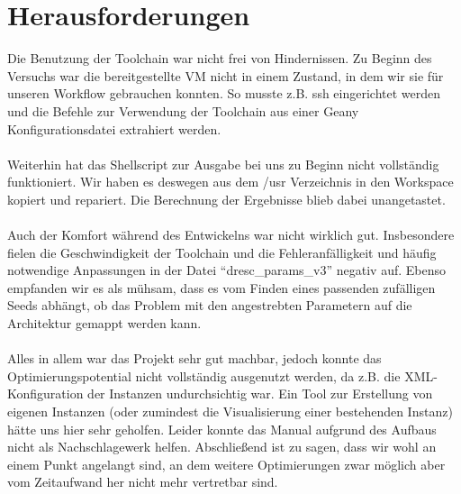 \documentclass[oneside,11pt,accentcolor=tud2b, nochapname]{tudexercise}
\begin{document}
\section*{Herausforderungen}

Die Benutzung der Toolchain war nicht frei von Hindernissen.
Zu Beginn des Versuchs war die bereitgestellte VM nicht in einem Zustand, in dem wir sie für unseren Workflow gebrauchen konnten.
So musste z.B. ssh eingerichtet werden und die Befehle zur Verwendung der Toolchain aus einer Geany Konfigurationsdatei extrahiert werden.\\
\\
Weiterhin hat das Shellscript zur Ausgabe bei uns zu Beginn nicht vollständig funktioniert. 
Wir haben es deswegen aus dem /usr Verzeichnis in den Workspace kopiert und repariert.
Die Berechnung der Ergebnisse blieb dabei unangetastet.\\
\\
Auch der Komfort während des Entwickelns war nicht wirklich gut.
Insbesondere fielen die Geschwindigkeit der Toolchain und die Fehleranfälligkeit und häufig notwendige Anpassungen in der Datei "`dresc\_params\_v3"' negativ auf.
Ebenso empfanden wir es als mühsam, dass es vom Finden eines passenden zufälligen Seeds abhängt, ob das Problem mit den angestrebten Parametern auf die Architektur gemappt werden kann.\\
\\
Alles in allem war das Projekt sehr gut machbar, jedoch konnte das Optimierungspotential nicht vollständig ausgenutzt werden, da z.B. die XML-Konfiguration der Instanzen undurchsichtig war.
Ein Tool zur Erstellung von eigenen Instanzen (oder zumindest die Visualisierung einer bestehenden Instanz) hätte uns hier sehr geholfen.
Leider konnte das Manual aufgrund des Aufbaus nicht als Nachschlagewerk helfen.
Abschließend ist zu sagen, dass wir wohl an einem Punkt angelangt sind, an dem weitere Optimierungen zwar möglich aber vom Zeitaufwand her nicht mehr vertretbar sind.
\end{document}

